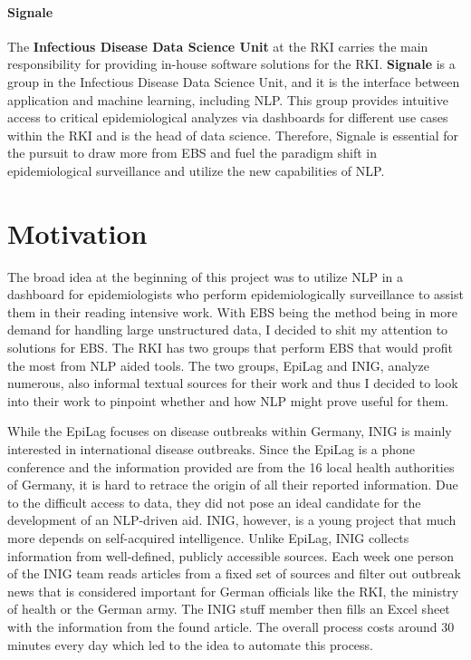\paragraph{Signale}
The \textbf{Infectious Disease Data Science Unit} at the RKI carries the main responsibility for providing in-house software solutions for the RKI.
\textbf{Signale} is a group in the Infectious Disease Data Science Unit, and it is the interface between application and machine learning, including NLP.
This group provides intuitive access to critical epidemiological analyzes via dashboards for different use cases within the RKI and is the head of data science.
Therefore, Signale is essential for the pursuit to draw more from EBS and fuel the paradigm shift in epidemiological surveillance and utilize the new capabilities of NLP.


\section{Motivation}
The broad idea at the beginning of this project was to utilize NLP in a dashboard for epidemiologists who perform epidemiologically
surveillance to assist them in their reading intensive work.
With EBS being the method being in more demand for handling large unstructured data, I decided to shit my attention to solutions for EBS.
The RKI has two groups that perform EBS that would profit the most from NLP aided tools. The two groups, EpiLag and INIG, analyze numerous, also informal textual sources for their work and thus I decided to look into their work to pinpoint whether and how NLP might prove useful for them.

While the EpiLag focuses on disease outbreaks within Germany, INIG is mainly interested in international disease outbreaks. Since the EpiLag is a phone conference and the information provided are from the 16 local health authorities of Germany, it is hard to retrace the origin of all their reported information.
Due to the difficult access to data, they did not pose an ideal candidate for the development of an NLP-driven aid.
INIG, however, is a young project that much more depends on self-acquired intelligence.
Unlike EpiLag, INIG collects information from well-defined, publicly accessible sources.
Each week one person of the INIG team reads articles from a fixed set of sources and filter out outbreak news that is considered important for German officials like the RKI, the ministry of health or the German army.
The INIG stuff member then fills an Excel sheet with the information from the found article.
The overall process costs around 30 minutes every day which led to the idea to automate this process.

